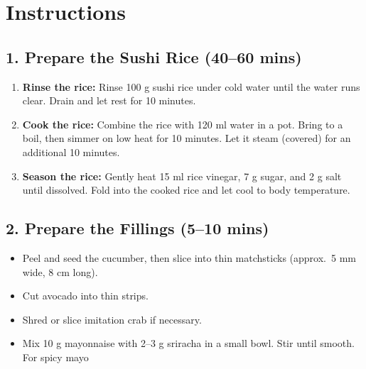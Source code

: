 \documentclass[landscape, a4paper]{article}
\newcommand\alert[1]{\textcolor{PrimaryColor}{\textbf{#1}}}
\begin{document}
\begin{minipage}[t]{0.31\textwidth}
	\vspace{0cm}
	\setlength{\parskip}{0.25cm}

	\section*{Instructions}
	\vspace{0.25cm}

	\subsection*{1. Prepare the Sushi Rice (40–60 mins)}
	\vspace{0.25cm}
	\begin{enumerate}
		\item \alert{Rinse the rice:} Rinse 100 g sushi rice under cold water until the water runs clear. Drain and let rest for 10 minutes.
		\item \alert{Cook the rice:} Combine the rice with 120 ml water in a pot. Bring to a boil, then simmer on low heat for 10 minutes. Let it steam (covered) for an additional 10 minutes.
		\item \alert{Season the rice:} Gently heat 15 ml rice vinegar, 7 g sugar, and 2 g salt until dissolved. Fold into the cooked rice and let cool to body temperature.
	\end{enumerate}

	\subsection*{2. Prepare the Fillings (5–10 mins)}
	\begin{itemize}
		\item Peel and seed the cucumber, then slice into thin matchsticks (approx.\ 5 mm wide, 8 cm long).
		\item Cut avocado into thin strips.
		\item Shred or slice imitation crab if necessary.
		\item Mix 10 g mayonnaise with 2–3 g sriracha in a small bowl. Stir until smooth. For spicy mayo
	\end{itemize}


\end{minipage}
\end{document}
